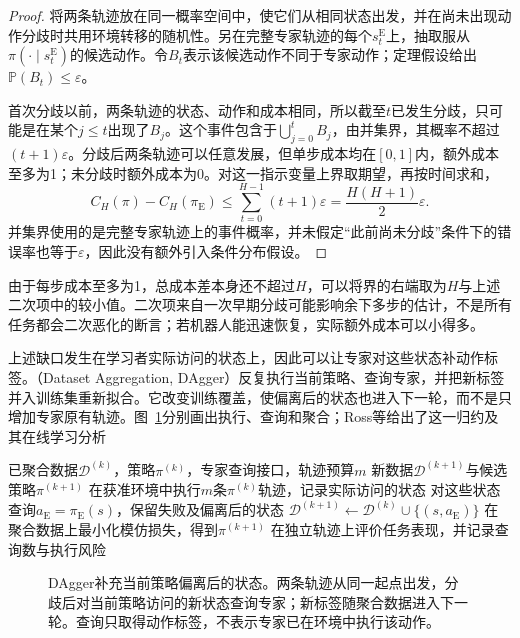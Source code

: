 \begin{proof}
  将两条轨迹放在同一概率空间中，使它们从相同状态出发，并在尚未出现动作分歧时共用环境转移的随机性。另在完整专家轨迹的每个$s_t^{\mathrm E}$上，抽取服从$\pi(\cdot\mid s_t^{\mathrm E})$的候选动作。令$B_t$表示该候选动作不同于专家动作；定理假设给出$\mathbb P(B_t)\leq\varepsilon$。

  首次分歧以前，两条轨迹的状态、动作和成本相同，所以截至$t$已发生分歧，只可能是在某个$j\leq t$出现了$B_j$。这个事件包含于$\bigcup_{j=0}^{t}B_j$，由并集界，其概率不超过$(t+1)\varepsilon$。分歧后两条轨迹可以任意发展，但单步成本均在$[0,1]$内，额外成本至多为1；未分歧时额外成本为0。对这一指示变量上界取期望，再按时间求和，
  \[
    C_H(\pi)-C_H(\pi_{\mathrm E})
    \leq\sum_{t=0}^{H-1}(t+1)\varepsilon
    =\frac{H(H+1)}2\varepsilon.
  \]
  并集界使用的是完整专家轨迹上的事件概率，并未假定“此前尚未分歧”条件下的错误率也等于$\varepsilon$，因此没有额外引入条件分布假设。
\end{proof}

由于每步成本至多为1，总成本差本身还不超过$H$，可以将界的右端取为$H$与上述二次项中的较小值。二次项来自一次早期分歧可能影响余下多步的估计，不是所有任务都会二次恶化的断言；若机器人能迅速恢复，实际额外成本可以小得多。

上述缺口发生在学习者实际访问的状态上，因此可以让专家对这些状态补动作标签。（Dataset Aggregation, DAgger）反复执行当前策略、查询专家，并把新标签并入训练集重新拟合。它改变训练覆盖，使偏离后的状态也进入下一轮，而不是只增加专家原有轨迹。图~\ref{fig:rl-reward-dagger}分别画出执行、查询和聚合；Ross等给出了这一归约及其在线学习分析

\begin{algorithm}[一轮DAgger更新]
  \label{alg:rl-reward-dagger}
  \begin{algorithmic}[1]
    \Require 已聚合数据$\mathcal D^{(k)}$，策略$\pi^{(k)}$，专家查询接口，轨迹预算$m$
    \Ensure 新数据$\mathcal D^{(k+1)}$与候选策略$\pi^{(k+1)}$
    \State 在获准环境中执行$m$条$\pi^{(k)}$轨迹，记录实际访问的状态
    \State 对这些状态查询$a_{\mathrm E}=\pi_{\mathrm E}(s)$，保留失败及偏离后的状态
    \State $\mathcal D^{(k+1)}\gets\mathcal D^{(k)}\cup\{(s,a_{\mathrm E})\}$
    \State 在聚合数据上最小化模仿损失，得到$\pi^{(k+1)}$
    \State 在独立轨迹上评价任务表现，并记录查询数与执行风险
  \end{algorithmic}
\end{algorithm}

\begin{figure}[htbp]
  \centering
  
  \caption{DAgger补充当前策略偏离后的状态。两条轨迹从同一起点出发，分歧后对当前策略访问的新状态查询专家；新标签随聚合数据进入下一轮。查询只取得动作标签，不表示专家已在环境中执行该动作。}
  \label{fig:rl-reward-dagger}
\end{figure}

